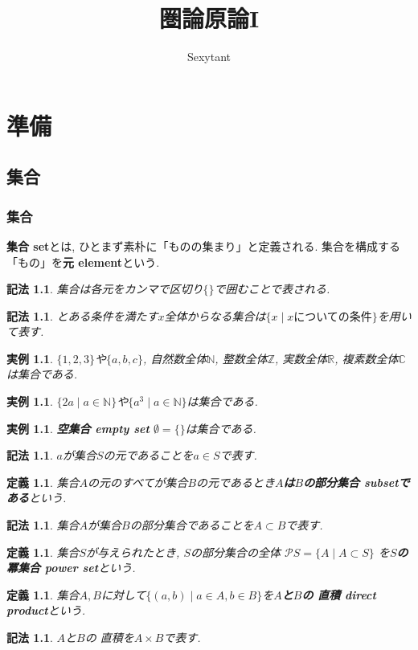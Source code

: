 \documentclass[dvipdfmx]{jsbook}
\title{圏論原論I}
\author{Sexytant}
\theoremstyle{plain}
\newtheorem{Def}[thm]{定義}
\newtheorem{Notation}[thm]{記法}
\newtheorem{example}[thm]{実例}
\begin{document}
\setcounter{tocdepth}{2}
\maketitle
\tableofcontents
\newpage
\part{準備}
\chapter{集合}
\section{集合}
{\bf 集合 set}とは, ひとまず素朴に「ものの集まり」と定義される. 集合を構成する「もの」を{\bf 元 element}という.
\begin{Notation}
集合は各元をカンマで区切り$\{\}$で囲むことで表される. 
\end{Notation}
\begin{Notation}
とある条件を満たす$x$全体からなる集合は$\{x\mid x\text{についての条件}\}$を用いて表す.
\end{Notation}
\begin{example}$\{1,2,3\}$や$\{a,b,c\}$, 自然数全体$\mathbb{N}$, 整数全体$\mathbb{Z}$, 実数全体$\mathbb{R}$, 複素数全体$\mathbb{C}$は集合である.
\end{example}
\begin{example}
$\{2a\mid a\in\mathbb{N}\}$や$\{a^3\mid a\in\mathbb{N}\}$は集合である.
\end{example}
\begin{example}
{\bf 空集合 empty set} $\emptyset=\{\}$は集合である.
\end{example}
\begin{Notation}
$a$が集合$S$の元であることを$a\in S$で表す.
\end{Notation}
\begin{Def}
集合$A$の元のすべてが集合$B$の元であるとき{\bf $A$は$B$の部分集合 subsetである}という.  
\end{Def}
\begin{Notation}
集合$A$が集合$B$の部分集合であることを$A\subset B$で表す.
\end{Notation}
\begin{Def}
集合$S$が与えられたとき, $S$の部分集合の全体
$\mathscr{P}S=\{A\mid A\subset S\}$
を{\bf $S$の冪集合 power set}という.
\end{Def}

\begin{Def}
集合$A,B$に対して$\{(a,b)\mid a\in A, b\in B\}$を{\bf $A$と$B$の
直積 direct product}という.
\end{Def}
\begin{Notation}
$A$と$B$の
直積を$A\times B$で表す.
\end{Notation}
\begin{comment}
実は, 集合を「ものの集まり」と素朴に定義することは, 矛盾を孕んでいる. この矛盾を避けるための議論はのちに行う. 
また, 集合論の公理には立ち入らないこととする.
\end{comment}
\end{document}
